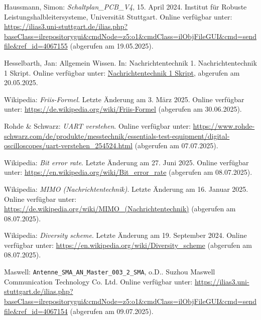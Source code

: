 \begin{thebibliography}{1}

Haussmann, Simon: \emph{Schaltplan\_PCB\_V4}, 15. April 2024. Institut für Robuste Leistungshalbleitersysteme, Universität Stuttgart. Online verfügbar unter: \url{https://ilias3.uni-stuttgart.de/ilias.php?baseClass=ilrepositorygui&cmdNode=z5:o1&cmdClass=ilObjFileGUI&cmd=sendfile&ref_id=4067155} (abgerufen am 19.05.2025).

Hesselbarth, Jan: Allgemein Wissen. In: Nachrichtentechnik 1. Nachrichtentechnik 1 Skript. Online verfügbar unter: \url{Nachrichtentechnik 1 Skript}, abgerufen am 20.05.2025.

Wikipedia: \emph{Friis-Formel}. Letzte Änderung am 3. März 2025.  
Online verfügbar unter: \url{https://de.wikipedia.org/wiki/Friis-Formel} (abgerufen am 30.06.2025).

Rohde \& Schwarz: \emph{UART verstehen}.  Online verfügbar unter: \url{https://www.rohde-schwarz.com/de/produkte/messtechnik/essentials-test-equipment/digital-oscilloscopes/uart-verstehen_254524.html} (abgerufen am 07.07.2025).

Wikipedia: \emph{Bit error rate}. Letzte Änderung am 27. Juni 2025.  
Online verfügbar unter: \url{https://en.wikipedia.org/wiki/Bit_error_rate} (abgerufen am 08.07.2025).

Wikipedia: \emph{MIMO (Nachrichtentechnik)}. Letzte Änderung am 16. Januar 2025.  
Online verfügbar unter: \url{https://de.wikipedia.org/wiki/MIMO_(Nachrichtentechnik)} (abgerufen am 08.07.2025).

Wikipedia: \emph{Diversity scheme}. Letzte Änderung am 19. September 2024.
Online verfügbar unter: \url{https://en.wikipedia.org/wiki/Diversity_scheme} (abgerufen am 08.07.2025).

Maswell: \texttt{Antenne\_SMA\_AN\_Master\_003\_2\_SMA}, o.D.. Suzhou Maswell Communication Technology Co. Ltd. Online verfügbar unter: \url{https://ilias3.uni-stuttgart.de/ilias.php?baseClass=ilrepositorygui&cmdNode=z5:o1&cmdClass=ilObjFileGUI&cmd=sendfile&ref_id=4067154} (abgerufen am 09.07.2025).

\end{thebibliography}

\clearpage
